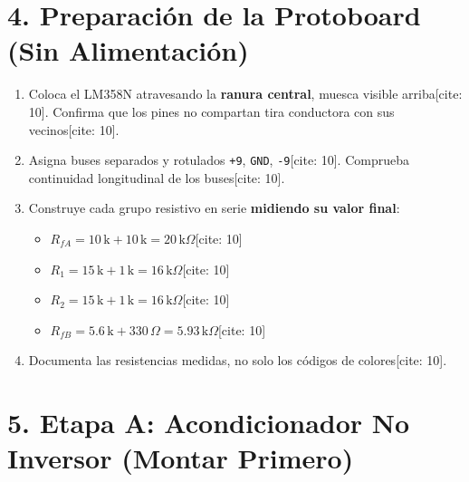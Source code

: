 \documentclass[11pt, a4paper]{article}
\begin{document}
\section{4. Preparación de la Protoboard (Sin Alimentación)}
\begin{enumerate}[noitemsep, leftmargin=*]
    \item Coloca el LM358N atravesando la \textbf{ranura central}, muesca visible arriba[cite: 10]. Confirma que los pines no compartan tira conductora con sus vecinos[cite: 10].
    \item Asigna buses separados y rotulados \texttt{+9}, \texttt{GND}, \texttt{-9}[cite: 10]. Comprueba continuidad longitudinal de los buses[cite: 10].
    \item Construye cada grupo resistivo en serie \textbf{midiendo su valor final}:
    \begin{itemize}[noitemsep, leftmargin=*]
        \item $R_{fA} = 10\,\text{k} + 10\,\text{k} = 20\,\text{k}\Omega$[cite: 10]
        \item $R_1 = 15\,\text{k} + 1\,\text{k} = 16\,\text{k}\Omega$[cite: 10]
        \item $R_2 = 15\,\text{k} + 1\,\text{k} = 16\,\text{k}\Omega$[cite: 10]
        \item $R_{fB} = 5.6\,\text{k} + 330\,\Omega = 5.93\,\text{k}\Omega$[cite: 10]
    \end{itemize}
    \item Documenta las resistencias medidas, no solo los códigos de colores[cite: 10].
\end{enumerate}

\section{5. Etapa A: Acondicionador No Inversor (Montar Primero)}
\end{document}

